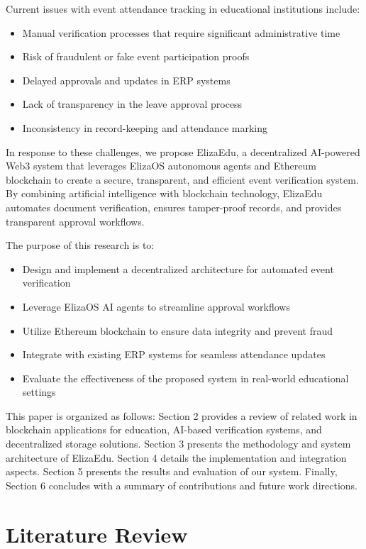 \documentclass[a4paper,12pt]{article}
\begin{document}
Current issues with event attendance tracking in educational institutions include:
\begin{itemize}
    \item Manual verification processes that require significant administrative time
    \item Risk of fraudulent or fake event participation proofs
    \item Delayed approvals and updates in ERP systems
    \item Lack of transparency in the leave approval process
    \item Inconsistency in record-keeping and attendance marking
\end{itemize}

In response to these challenges, we propose ElizaEdu, a decentralized AI-powered Web3 system that leverages ElizaOS autonomous agents and Ethereum blockchain to create a secure, transparent, and efficient event verification system. By combining artificial intelligence with blockchain technology, ElizaEdu automates document verification, ensures tamper-proof records, and provides transparent approval workflows.

The purpose of this research is to:
\begin{itemize}
    \item Design and implement a decentralized architecture for automated event verification
    \item Leverage ElizaOS AI agents to streamline approval workflows
    \item Utilize Ethereum blockchain to ensure data integrity and prevent fraud
    \item Integrate with existing ERP systems for seamless attendance updates
    \item Evaluate the effectiveness of the proposed system in real-world educational settings
\end{itemize}

This paper is organized as follows: Section 2 provides a review of related work in blockchain applications for education, AI-based verification systems, and decentralized storage solutions. Section 3 presents the methodology and system architecture of ElizaEdu. Section 4 details the implementation and integration aspects. Section 5 presents the results and evaluation of our system. Finally, Section 6 concludes with a summary of contributions and future work directions.

\section{Literature Review}
\end{document}
